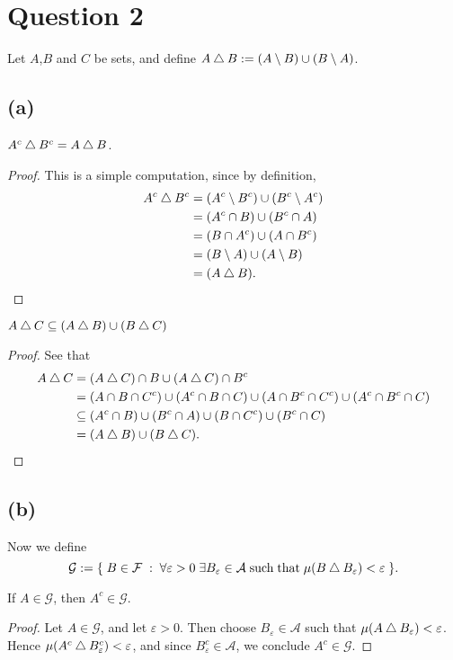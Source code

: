 \documentclass{unswmaths}
\begin{document}
\section*{Question 2}
Let $A$,$B$ and $C$ be sets, and define $A \bigtriangleup B := (A\setminus B)\cup (B\setminus A)$.
\subsection*{(a)}
\begin{lemma}
    $A^c \bigtriangleup B^c = A\bigtriangleup B$.
\end{lemma}
\begin{proof}
    This is a simple computation, since by definition,
    \begin{align*}
        A^c \bigtriangleup B^c &= (A^c \setminus B^c)\cup (B^c \setminus A^c)\\
        &= (A^c\cap B)\cup (B^c \cap A)\\
        &= (B\cap A^c)\cup (A\cap B^c)\\
        &= (B \setminus A)\cup (A\setminus B)\\
        &= (A \bigtriangleup B).
    \end{align*}
\end{proof}
\begin{lemma}
    $A\bigtriangleup C \subseteq (A\bigtriangleup B)\cup (B\bigtriangleup C)$
\end{lemma}
\begin{proof}
    See that
    \begin{align*}
        A\bigtriangleup C &= (A\bigtriangleup C)\cap B \cup (A\bigtriangleup C)\cap B^c\\
        &= (A\cap B\cap C^c)\cup (A^c \cap B \cap C)\cup (A\cap B^c \cap C^c)\cup (A^c\cap B^c\cap C)\\
        &\subseteq (A^c\cap B)\cup (B^c\cap A)\cup (B\cap C^c)\cup (B^c\cap C)\\
        &= (A\bigtriangleup B)\cup (B\bigtriangleup C).
    \end{align*}
\end{proof}

\subsection*{(b)}
Now we define
\begin{equation*}
    \mathcal{G} := \{\;B \in \mathcal{F}\;:\;\forall\varepsilon > 0\;\exists B_\varepsilon \in \mathcal{A}\;\text{such}\;\text{that}\;\mu(B\bigtriangleup B_\varepsilon) < \varepsilon\;\}.
\end{equation*}
\begin{lemma}
    If $A \in \mathcal{G}$, then $A^c \in \mathcal{G}$.
\end{lemma}
\begin{proof}
    Let $A \in \mathcal{G}$, and let $\varepsilon > 0$. Then choose $B_\varepsilon \in \mathcal{A}$
    such that $\mu(A \bigtriangleup B_\varepsilon) < \varepsilon$. Hence $\mu(A^c \bigtriangleup B^c_\varepsilon) < \varepsilon$,
    and since $B^c_\varepsilon \in \mathcal{A}$, we conclude $A^c \in \mathcal{G}$.
\end{proof}
\end{document}
